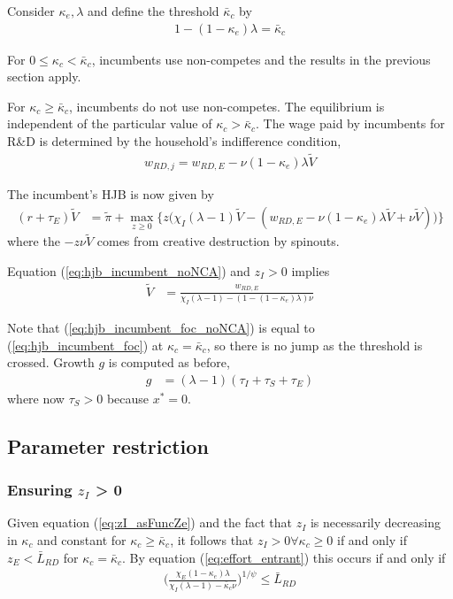 \documentclass[12pt,english]{article}
\theoremstyle{remark}
\begin{document}
Consider $\kappa_{e}, \lambda$ and define the threshold $\bar{\kappa}_c$ by 
\begin{align}
	1-(1-\kappa_{e})\lambda= \bar{\kappa}_c \label{eq_nca_threshold}
\end{align}

For $0 \le \kappa_{c} < \bar{\kappa}_c$, incumbents use non-competes and the results in the previous section apply.

For $\kappa_{c} \ge \bar{\kappa}_c$, incumbents do not use non-competes. The equilibrium is independent of the particular value of $\kappa_{c} > \bar{\kappa}_c$. The wage paid by incumbents for R\&D is determined by the household's indifference condition,
\begin{align}
	w_{RD,j} = w_{RD,E}- \nu (1-\kappa_{e}) \lambda \tilde{V} \label{eq:wage_rd}
\end{align}

The incumbent's HJB is now given by 
\begin{align}
	(r + \tau_E) \tilde{V} &= \tilde{\pi} + \max_{z \ge 0 } \Big\{ z \Big( \chi_I (\lambda - 1) \tilde{V} - (w_{RD,E} - \nu (1-\kappa_{e}) \lambda \tilde{V} + \nu \tilde{V} )\Big)  \Big\}\label{eq:hjb_incumbent_noNCA}
\end{align}
where the $-z \nu \tilde{V}$ comes from creative destruction by spinouts.

Equation (\ref{eq:hjb_incumbent_noNCA}) and $z_I > 0$ implies
\begin{align}
\tilde{V} &= \frac{w_{RD,E}}{\chi_I(\lambda - 1) - (1-(1-\kappa_{e})\lambda)\nu} \label{eq:hjb_incumbent_foc_noNCA}
\end{align}

Note that (\ref{eq:hjb_incumbent_foc_noNCA}) is equal to (\ref{eq:hjb_incumbent_foc}) at $\kappa_{c} = \bar{\kappa}_c$, so there is no jump as the threshold is crossed. Growth $g$ is computed as before,
\begin{align}
g &= (\lambda - 1)(\tau_I + \tau_S + \tau_E) \label{eq:growth_accounting_noNCA}
\end{align}
where now $\tau_S > 0$ because $x^* = 0$. 

\subsection{Parameter restriction}

\subsubsection{Ensuring $z_I$ > 0}
Given equation (\ref{eq:zI_asFuncZe}) and the fact that $z_I$ is necessarily decreasing in $\kappa_c$ and constant for $\kappa_c \ge \bar{\kappa}_c$, it follows that $z_I > 0 \forall \kappa_c \ge 0$ if and only if $z_E < \bar{L}_{RD}$ for $\kappa_c = \bar{\kappa}_c$. By equation (\ref{eq:effort_entrant}) this occurs if and only if
\begin{align}
	\Big( \frac{\chi_E (1-\kappa_{e}) \lambda}{\chi_I(\lambda-1) - \bar{\kappa}_c \nu } \Big)^{1/\psi} \le \bar{L}_{RD}
\end{align}
\end{document}
